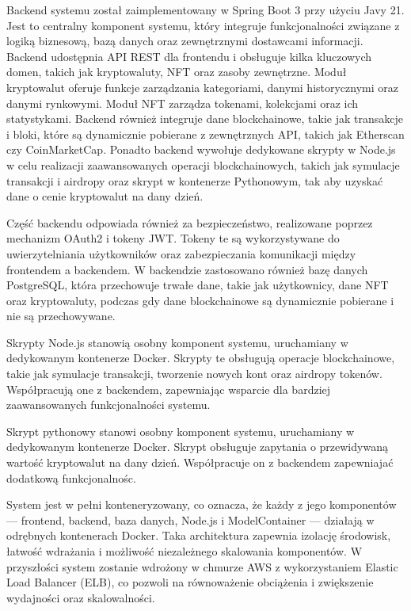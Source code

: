 Backend systemu został zaimplementowany w Spring Boot 3 przy użyciu Javy 21. Jest to centralny komponent systemu, który integruje funkcjonalności związane z logiką biznesową, bazą danych oraz zewnętrznymi dostawcami informacji. Backend udostępnia API REST dla frontendu i obsługuje kilka kluczowych domen, takich jak kryptowaluty, NFT oraz zasoby zewnętrzne. Moduł kryptowalut oferuje funkcje zarządzania kategoriami, danymi historycznymi oraz danymi rynkowymi. Moduł NFT zarządza tokenami, kolekcjami oraz ich statystykami. Backend również integruje dane blockchainowe, takie jak transakcje i bloki, które są dynamicznie pobierane z zewnętrznych API, takich jak Etherscan czy CoinMarketCap. Ponadto backend wywołuje dedykowane skrypty w Node.js w celu realizacji zaawansowanych operacji blockchainowych, takich jak symulacje transakcji i airdropy oraz skrypt w kontenerze Pythonowym, tak aby uzyskać dane o cenie kryptowalut na dany dzień.

Część backendu odpowiada również za bezpieczeństwo, realizowane poprzez mechanizm OAuth2 i tokeny JWT. Tokeny te są wykorzystywane do uwierzytelniania użytkowników oraz zabezpieczania komunikacji między frontendem a backendem. W backendzie zastosowano również bazę danych PostgreSQL, która przechowuje trwałe dane, takie jak użytkownicy, dane NFT oraz kryptowaluty, podczas gdy dane blockchainowe są dynamicznie pobierane i nie są przechowywane.

Skrypty Node.js stanowią osobny komponent systemu, uruchamiany w dedykowanym kontenerze Docker. Skrypty te obsługują operacje blockchainowe, takie jak symulacje transakcji, tworzenie nowych kont oraz airdropy tokenów. Współpracują one z backendem, zapewniając wsparcie dla bardziej zaawansowanych funkcjonalności systemu.

Skrypt pythonowy stanowi osobny komponent systemu, uruchamiany w dedykowanym kontenerze Docker. Skrypt obsługuje zapytania o przewidywaną wartość kryptowalut na dany dzień. Współpracuje on z backendem zapewniajać dodatkową funkcjonalnośc.

System jest w pełni konteneryzowany, co oznacza, że każdy z jego komponentów — frontend, backend, baza danych, Node.js i ModelContainer — działają w odrębnych kontenerach Docker. Taka architektura zapewnia izolację środowisk, łatwość wdrażania i możliwość niezależnego skalowania komponentów. W przyszłości system zostanie wdrożony w chmurze AWS z wykorzystaniem Elastic Load Balancer (ELB), co pozwoli na równoważenie obciążenia i zwiększenie wydajności oraz skalowalności.

